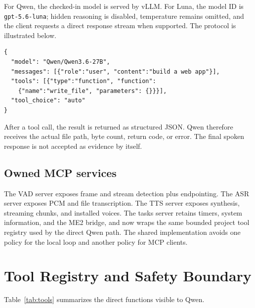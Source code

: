 \documentclass[sigconf,nonacm,balance=false]{acmart}
\begin{document}
For Qwen, the checked-in model is served by vLLM. For Luna, the model ID is
\texttt{gpt-5.6-luna}; hidden reasoning is disabled, temperature remains
omitted, and the client requests a direct response stream when supported. The
protocol is illustrated below.

\begin{lstlisting}
{
  "model": "Qwen/Qwen3.6-27B",
  "messages": [{"role":"user", "content":"build a web app"}],
  "tools": [{"type":"function", "function":
    {"name":"write_file", "parameters": {}}}],
  "tool_choice": "auto"
}
\end{lstlisting}

After a tool call, the result is returned as structured JSON. Qwen therefore
receives the actual file path, byte count, return code, or error. The final
spoken response is not accepted as evidence by itself.

\subsection{Owned MCP services}

The VAD server exposes frame and stream detection plus endpointing. The ASR
server exposes PCM and file transcription. The TTS server exposes synthesis,
streaming chunks, and installed voices. The tasks server retains timers,
system information, and the ME2 bridge, and now wraps the same bounded project
tool registry used by the direct Qwen path. The shared implementation avoids
one policy for the local loop and another policy for MCP clients.

\section{Tool Registry and Safety Boundary}

Table~\ref{tab:tools} summarizes the direct functions visible to Qwen.
\end{document}
